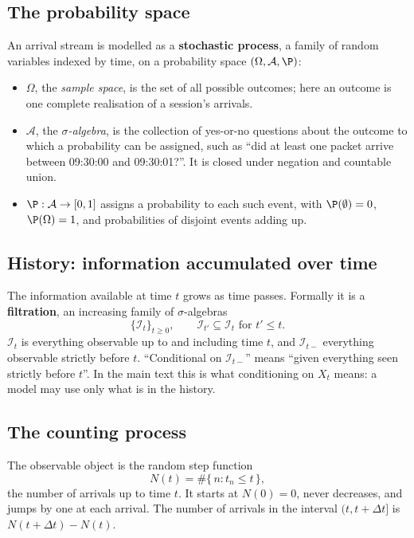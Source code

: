 \subsection{The probability space}
\label{app:pp-probspace}

An arrival stream is modelled as a \textbf{stochastic process}, a family of random variables indexed
by time, on a probability space $(\Omega, \mathcal{A}, \P)$:
\begin{itemize}[leftmargin=1.5em,itemsep=1pt]
\item $\Omega$, the \emph{sample space}, is the set of all possible outcomes; here an outcome is one
  complete realisation of a session's arrivals.
\item $\mathcal{A}$, the \emph{$\sigma$-algebra}, is the collection of yes-or-no questions about the
  outcome to which a probability can be assigned, such as ``did at least one packet arrive between
  09:30:00 and 09:30:01?''. It is closed under negation and countable union.
\item $\P : \mathcal{A} \to [0, 1]$ assigns a probability to each such event, with
  $\P(\emptyset) = 0$, $\P(\Omega) = 1$, and probabilities of disjoint events adding up.
\end{itemize}

\subsection{History: information accumulated over time}
\label{app:pp-history}

The information available at time $t$ grows as time passes. Formally it is a
\textbf{filtration}, an increasing family of $\sigma$-algebras
\[
  \{\mathcal{I}_t\}_{t \ge 0}, \qquad \mathcal{I}_{t'} \subseteq \mathcal{I}_t \text{ for } t' \le t.
\]
$\mathcal{I}_t$ is everything observable up to and including time $t$, and $\mathcal{I}_{t-}$
everything observable strictly before $t$. ``Conditional on $\mathcal{I}_{t-}$'' means ``given
everything seen strictly before $t$''. In the main text this is what conditioning on $X_t$ means: a
model may use only what is in the history.

\subsection{The counting process}
\label{app:pp-counting}

The observable object is the random step function
\[
  N(t) = \#\{\, n : t_n \le t \,\},
\]
the number of arrivals up to time $t$. It starts at $N(0) = 0$, never decreases, and jumps by one at
each arrival. The number of arrivals in the interval $(t, t + \Delta t]$ is $N(t + \Delta t) - N(t)$.

